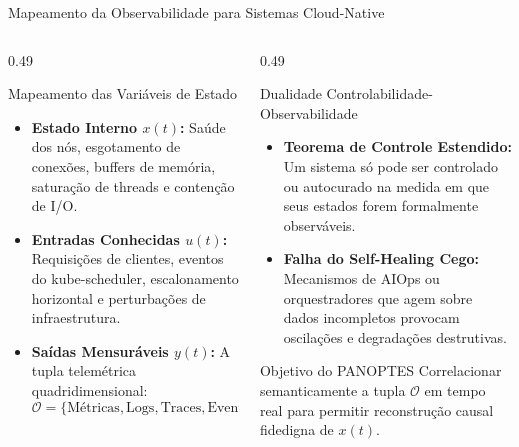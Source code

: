 \documentclass[aspectratio=169, 10pt]{beamer}
\begin{document}
\begin{frame}{Mapeamento da Observabilidade para Sistemas Cloud-Native}
  \begin{columns}[T]
    \begin{column}{0.49\textwidth}
      \begin{block}{Mapeamento das Variáveis de Estado}
        \small
        \begin{itemize}
          \item \textbf{Estado Interno $x(t)$:} Saúde dos nós, esgotamento de conexões, buffers de memória, saturação de threads e contenção de I/O.
          \item \textbf{Entradas Conhecidas $u(t)$:} Requisições de clientes, eventos do kube-scheduler, escalonamento horizontal e perturbações de infraestrutura.
          \item \textbf{Saídas Mensuráveis $y(t)$:} A tupla telemétrica quadridimensional:
            \begin{equation*}
              \mathcal{O} = \{ \text{Métricas}, \text{Logs}, \text{Traces}, \text{Eventos} \}
            \end{equation*}
        \end{itemize}
      \end{block}
    \end{column}
    
    \begin{column}{0.49\textwidth}
      \begin{exampleblock}{Dualidade Controlabilidade-Observabilidade}
        \small
        \begin{itemize}
          \item \textbf{Teorema de Controle Estendido:} Um sistema só pode ser controlado ou autocurado na medida em que seus estados forem formalmente observáveis.
          \item \textbf{Falha do Self-Healing Cego:} Mecanismos de AIOps ou orquestradores que agem sobre dados incompletos provocam oscilações e degradações destrutivas.
        \end{itemize}
      \end{exampleblock}
      \vspace{0.8ex}
      \begin{alertblock}{Objetivo do PANOPTES}
        \small
        Correlacionar semanticamente a tupla $\mathcal{O}$ em tempo real para permitir reconstrução causal fidedigna de $x(t)$.
      \end{alertblock}
    \end{column}
  \end{columns}
\end{frame}
\end{document}
